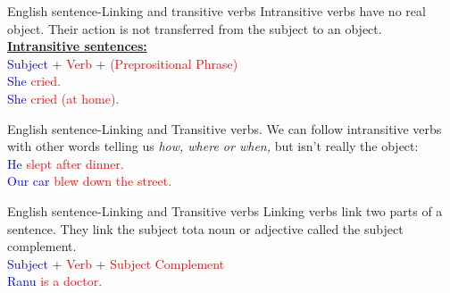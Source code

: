 \documentclass{beamer}
\begin{document}
\begin{frame}{English sentence-Linking and transitive verbs}
\centering
Intransitive verbs have no real object. Their action is not transferred from the subject to an object.\\
\vspace{0.2in}
\textbf{\underline{Intransitive sentences:}}\\
\vspace{0.2in}
\textcolor{blue}{Subject} + \textcolor{red}{Verb} + \textcolor{red}{(Preprositional Phrase)}\\
\vspace{0.2in}
\textcolor{blue}{She} \textcolor{red}{cried.}\\
\vspace{0.2in}
\textcolor{blue}{She} \textcolor{red}{cried (at home).}    
\end{frame}

\begin{frame}{English sentence-Linking and Transitive verbs.}
\centering
We can follow intransitive verbs with other words telling us \textit{how, where or when,} but isn't really the object:\\
\vspace{0.2in}
\textcolor{blue}{He} \textcolor{red}{slept after dinner.}\\
\vspace{0.2in}
\textcolor{blue}{Our car} \textcolor{red}{blew down the street.}\\   
\end{frame}

\begin{frame}{English sentence-Linking and Transitive verbs}
\centering
Linking verbs link two parts of a sentence. They link the subject tota noun or adjective called the subject complement.\\
\vspace{0.2in}
\textcolor{blue}{Subject} + \textcolor{red}{Verb} + \textcolor{red}{Subject Complement}\\
\vspace{0.2in}
\textcolor{blue}{Ranu} \textcolor{red}{is a doctor.} \\  
\end{frame}
\end{document}
